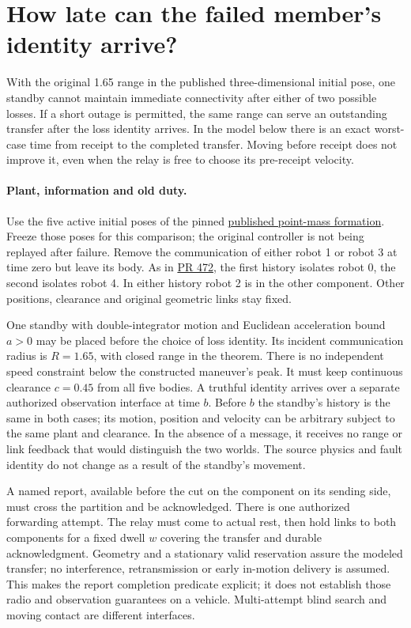 \documentclass[11pt]{article}
\begin{document}
\section*{How late can the failed member's identity arrive?}
With the original 1.65 range in the published three-dimensional initial pose, one standby cannot maintain immediate connectivity after either of two possible losses. If a short outage is permitted, the same range can serve an outstanding transfer after the loss identity arrives. In the model below there is an exact worst-case time from receipt to the completed transfer. Moving before receipt does not improve it, even when the relay is free to choose its pre-receipt velocity.

\paragraph{Plant, information and old duty.}
Use the five active initial poses of the pinned \href{https://github.com/KTH-DHSG/constrained_omrs/tree/cb87f91aaaa4e652de043704ce4dfb989e10bcde}{published point-mass formation}. Freeze those poses for this comparison; the original controller is not being replayed after failure. Remove the communication of either robot 1 or robot 3 at time zero but leave its body. As in \href{https://github.com/eternal-november/eos-research-programmes/pull/472}{PR 472}, the first history isolates robot 0, the second isolates robot 4. In either history robot 2 is in the other component. Other positions, clearance and original geometric links stay fixed.

One standby with double-integrator motion and Euclidean acceleration bound $a>0$ may be placed before the choice of loss identity. Its incident communication radius is $R=1.65$, with closed range in the theorem. There is no independent speed constraint below the constructed maneuver's peak. It must keep continuous clearance $c=0.45$ from all five bodies. A truthful identity arrives over a separate authorized observation interface at time $b$. Before $b$ the standby's history is the same in both cases; its motion, position and velocity can be arbitrary subject to the same plant and clearance. In the absence of a message, it receives no range or link feedback that would distinguish the two worlds. The source physics and fault identity do not change as a result of the standby's movement.

A named report, available before the cut on the component on its sending side, must cross the partition and be acknowledged. There is one authorized forwarding attempt. The relay must come to actual rest, then hold links to both components for a fixed dwell $w$ covering the transfer and durable acknowledgment. Geometry and a stationary valid reservation assure the modeled transfer; no interference, retransmission or early in-motion delivery is assumed. This makes the report completion predicate explicit; it does not establish those radio and observation guarantees on a vehicle. Multi-attempt blind search and moving contact are different interfaces.
\end{document}
